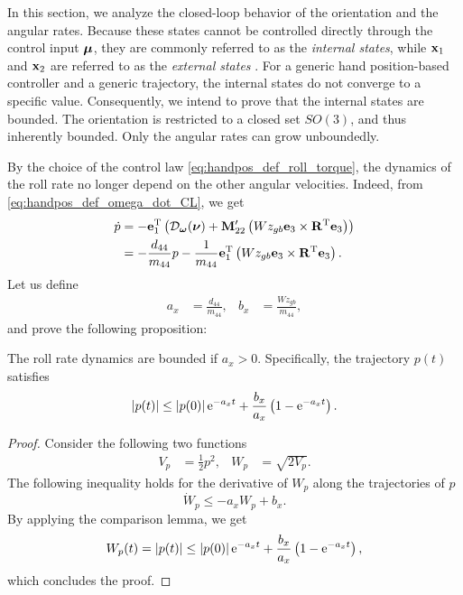 In this section, we analyze the closed-loop behavior of the orientation and the angular rates.
Because these states cannot be controlled directly through the control input $\bm{\mu}$, they are commonly referred to as the \emph{internal states}, while $\mathbf{x}_1$ and $\mathbf{x}_2$ are referred to as the \emph{external states} \cite{paliotta_trajectory_2019}.
For a generic hand position-based controller and a generic trajectory, the internal states do not converge to a specific value.
Consequently, we intend to prove that the internal states are bounded.
The orientation is restricted to a closed set $SO(3)$, and thus inherently bounded.
Only the angular rates can grow unboundedly.

By the choice of the control law \eqref{eq:handpos_def_roll_torque}, the dynamics of the roll rate no longer depend on the other angular velocities.
Indeed, from \eqref{eq:handpos_def_omega_dot_CL}, we get
\begin{equation}
    \begin{split}
        \dot{p} &= - \mathbf{e}_1^{\mathrm{T}} \left(\mathcal{D}_{\bm{\omega}}(\bm{\nu}) + \mathbf{M}_{22}^{\prime}\left(Wz_{gb} \mathbf{e}_3 \times \mathbf{R}^{\mathrm{T}} \mathbf{e}_3\right)\right) \\
            &= - \frac{d_{44}}{m_{44}} p - \frac{1}{m_{44}} \mathbf{e}_1^{\mathrm{T}} \left(Wz_{gb} \mathbf{e}_3 \times \mathbf{R}^{\mathrm{T}} \mathbf{e}_3\right).
    \end{split}
\end{equation}
Let us define
\begin{align}
    a_x &= \frac{d_{44}}{m_{44}}, &
    b_x &= \frac{Wz_{gb}}{m_{44}},
\end{align}
and prove the following proposition:

\begin{lemma}
    \label{lemma:handpos_def_roll_rate}
    The roll rate dynamics are bounded if $a_x > 0$.
    Specifically, the trajectory $p(t)$ satisfies
    \begin{equation}
        \left|p(t)\right| \leq \left|p(0)\right|{\rm e}^{-a_xt} + \frac{b_x}{a_x}\left(1 - {\rm e}^{-a_xt}\right).
    \end{equation}
\end{lemma}
\begin{proof}
    Consider the following two functions
    \begin{align}
        V_{p} &= \frac{1}{2} p^2, &
        W_{p} &= \sqrt{2 V_{p}}.
    \end{align}
    The following inequality holds for the derivative of $W_p$ along the trajectories of $p$
    \begin{equation}
        \dot{W}_p \leq -a_xW_p + b_x.
    \end{equation}
    By applying the comparison lemma, we get
    \begin{equation}
        W_p(t) = \left|p(t)\right| \leq \left|p(0)\right|{\rm e}^{-a_xt} + \frac{b_x}{a_x}\left(1 - {\rm e}^{-a_xt}\right),
    \end{equation}
    which concludes the proof.
\end{proof}


